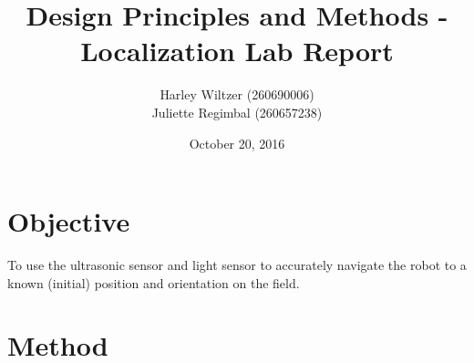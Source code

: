 \documentclass[11pt]{article}
\title{Design Principles and Methods - Localization Lab Report}
\author{Harley Wiltzer (260690006)\\Juliette Regimbal (260657238)}
\date{October 20, 2016}
\begin{document}
\maketitle
{}


\section{Objective}
To use the ultrasonic sensor and light sensor to accurately navigate the robot to a known (initial) position and orientation on the field.
\section{Method}
\end{document}

